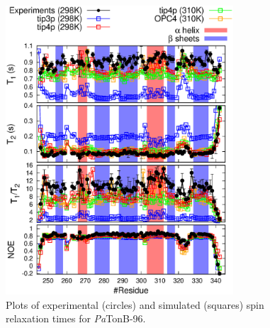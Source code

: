 \documentclass[journal=jpcbfk,manuscript=article]{achemso}
\begin{document}
\begin{figure}[tb]
  \includegraphics[width=8.5cm]{../Figs/PsTonBrelaxationDATA.eps}%
  \caption{Plots of experimental (circles) and simulated (squares) spin relaxation times
    for {\it Pa}TonB-96. \label{PsTonBrelaxationDATA}}%
\end{figure}
\end{document}
